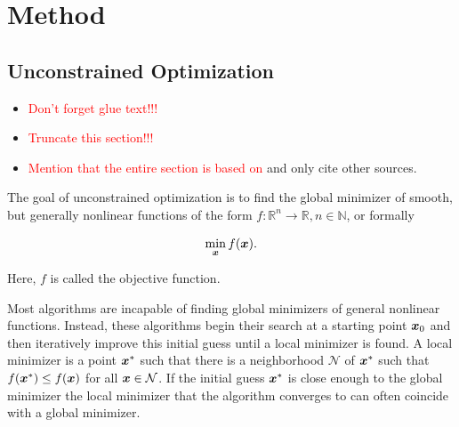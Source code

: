 \chapter{Method}\label{ch:method}

\section{Unconstrained Optimization}\label{s:unconstrained-optimization}
\begin{itemize}
    \item \textcolor{red}{Don't forget glue text!!!}
    \item \textcolor{red}{Truncate this section!!!}
    \item \textcolor{red}{Mention that the entire section is based on \cite{nocedal2006}} and only cite other sources.
\end{itemize}

The goal of unconstrained optimization is to find the global minimizer of smooth, but generally nonlinear functions of the form $f \colon 
\mathbb{R}^n \to \mathbb{R}, n \in \mathbb{N}$, or formally

\[
    \min_{\bm{x}} f(\bm{x}).
\]

\noindent Here, $f$ is called the objective function. 

Most algorithms are incapable of finding global minimizers of general nonlinear functions. 
Instead, these algorithms begin their search at a starting point $\bm{x}_0$ and then iteratively improve this initial guess until a local 
minimizer is found. A local minimizer is a point $\bm{x}^*$ such that there is a neighborhood $\mathcal{N}$ of 
$\bm{x}^*$ such that $f(\bm{x}^*) \leq f(\bm{x})$ for all $\bm{x} \in \mathcal{N}$. If the initial guess $\bm{x}^*$ is close enough 
to the global minimizer the local minimizer that the algorithm converges to can often coincide with a global minimizer. 

